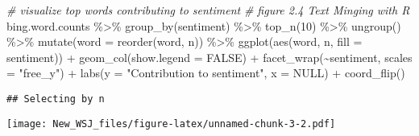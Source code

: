 \documentclass[
]{article}
\newenvironment{Shaded}{\begin{snugshade}}{\end{snugshade}}
\newcommand{\AttributeTok}[1]{\textcolor[rgb]{0.77,0.63,0.00}{#1}}
\newcommand{\CommentTok}[1]{\textcolor[rgb]{0.56,0.35,0.01}{\textit{#1}}}
\newcommand{\ConstantTok}[1]{\textcolor[rgb]{0.00,0.00,0.00}{#1}}
\newcommand{\DecValTok}[1]{\textcolor[rgb]{0.00,0.00,0.81}{#1}}
\newcommand{\FunctionTok}[1]{\textcolor[rgb]{0.00,0.00,0.00}{#1}}
\newcommand{\NormalTok}[1]{#1}
\newcommand{\SpecialCharTok}[1]{\textcolor[rgb]{0.00,0.00,0.00}{#1}}
\newcommand{\StringTok}[1]{\textcolor[rgb]{0.31,0.60,0.02}{#1}}
\begin{document}
\begin{Shaded}
\begin{Highlighting}[]
\CommentTok{\# visualize top words contributing to sentiment}
\CommentTok{\# figure 2.4 Text Minging with R}
\NormalTok{bing.word.counts }\SpecialCharTok{\%\textgreater{}\%}
  \FunctionTok{group\_by}\NormalTok{(sentiment) }\SpecialCharTok{\%\textgreater{}\%}
  \FunctionTok{top\_n}\NormalTok{(}\DecValTok{10}\NormalTok{) }\SpecialCharTok{\%\textgreater{}\%}
  \FunctionTok{ungroup}\NormalTok{() }\SpecialCharTok{\%\textgreater{}\%}
  \FunctionTok{mutate}\NormalTok{(}\AttributeTok{word =} \FunctionTok{reorder}\NormalTok{(word, n)) }\SpecialCharTok{\%\textgreater{}\%}
  \FunctionTok{ggplot}\NormalTok{(}\FunctionTok{aes}\NormalTok{(word, n, }\AttributeTok{fill =}\NormalTok{ sentiment)) }\SpecialCharTok{+}
  \FunctionTok{geom\_col}\NormalTok{(}\AttributeTok{show.legend =} \ConstantTok{FALSE}\NormalTok{) }\SpecialCharTok{+}
  \FunctionTok{facet\_wrap}\NormalTok{(}\SpecialCharTok{\textasciitilde{}}\NormalTok{sentiment, }\AttributeTok{scales =} \StringTok{"free\_y"}\NormalTok{) }\SpecialCharTok{+}
  \FunctionTok{labs}\NormalTok{(}\AttributeTok{y =} \StringTok{"Contribution to sentiment"}\NormalTok{,}
       \AttributeTok{x =} \ConstantTok{NULL}\NormalTok{) }\SpecialCharTok{+}
  \FunctionTok{coord\_flip}\NormalTok{()}
\end{Highlighting}
\end{Shaded}

\begin{verbatim}
## Selecting by n
\end{verbatim}

\texttt{[image: New\_WSJ\_files/figure-latex/unnamed-chunk-3-2.pdf]}
\end{document}
